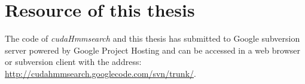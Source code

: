 
\chapter{Resource of this thesis} %

\label{AppendixA} %


The code of \emph{cudaHmmsearch} and this thesis has submitted to Google subversion server powered by Google Project Hosting and can be accessed in a web browser or subversion client with the address:
\url{http://cudahmmsearch.googlecode.com/svn/trunk/}.